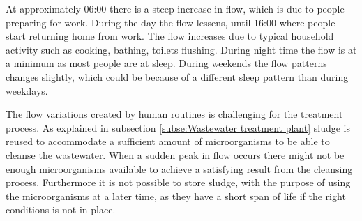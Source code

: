 At approximately 06:00 there is a steep increase in flow, which is due to people preparing for work.%
 During the day the flow lessens, until 16:00 where people start returning home from work. The flow increases due to typical household activity such as cooking, bathing, toilets flushing. During night time the flow is at a minimum as most people are at sleep. During weekends the flow patterns changes slightly, which could be because of a different sleep pattern than during weekdays.  %

The flow variations created by human routines is challenging for the treatment process. As explained in subsection \ref{subse:Wastewater treatment plant} sludge is reused to accommodate a sufficient amount of microorganisms to be able to cleanse the wastewater. When a sudden peak in flow occurs there might not be enough microorganisms available to achieve a satisfying result from the cleansing process. Furthermore it is not possible to store sludge, with the purpose of using the microorganisms at a later time, as they have a short span of life if the right conditions is not in place.

